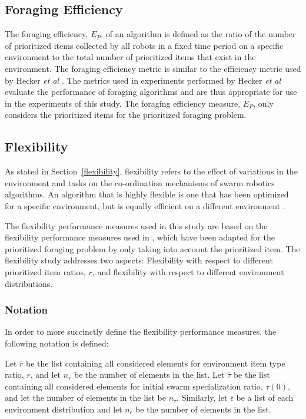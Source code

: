 \subsection{Foraging Efficiency}
\label{setup:foragingefficiency}
The foraging efficiency, $E_P$, of an algorithm is defined as the ratio of the number of prioritized items collected by all robots in a fixed time period on a specific environment to the total number of prioritized items that exist in the environment. The foraging efficiency metric is similar to the efficiency metric used by Hecker \textit{et al} \cite{hecker2015beyond}. The metrics used in experiments performed by Hecker \textit{et al} evaluate the performance of foraging algorithms and are thus appropriate for use in the experiments of this study. The foraging efficiency measure, $E_P$, only considers the prioritized items for the prioritized foraging problem.


\subsection{Flexibility}
\label{setup:flexibility}

As stated in Section~\ref{flexibility}, flexibility refers to the effect of variations in the environment and tasks on the co-ordination mechanisms of swarm robotics algorithms. An algorithm that is highly flexible is one that has been optimized for a specific environment, but is equally efficient on a different environment \cite{hecker2015beyond}.

The flexibility performance measures used in this study are based on the flexibility performance measures used in \cite{hecker2015beyond}, which have been adapted for the prioritized foraging problem by only taking into account the prioritized item. The flexibility study addresses two aspects: Flexibility with respect to different prioritized item ratios, $r$, and flexibility with respect to different environment distributions.

\subsubsection{Notation}

In order to more succinctly define the flexibility performance measures, the following notation is defined:

Let $\overline{r}$ be the list containing all considered elements for environment item type ratio, $r$, and let $n_r$ be the number of elements in the list. Let $\overline{\tau}$ be the list containing all considered elements for initial swarm specialization ratio, $\tau(0)$, and let the number of elements in the list be $n_\tau$. Similarly, let $\overline{\epsilon}$ be a list of each environment distribution and let $n_\epsilon$ be the number of elements in the list.

